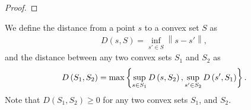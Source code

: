 \begin{proof}
% 
% 

% 
% 

\end{proof}


We define the distance from a point $s$ to a convex set $S$ as
\begin{align*}
D\left(s, S\right) = \inf_{s' \in S} \left\|s - s'\right\|,
\end{align*}
and the distance between any two convex sets $S_1$ and $S_2$ as
\begin{align}
{D}\left(S_1, S_2\right) = 
\max \left\{
	\sup_{s  \in S_1} D\left(s , S_2\right),
	\sup_{s' \in S_2} D\left(s', S_1\right)
\right\}. \label{define_a_difference_between_sets}
\end{align}
Note that $D\left(S_1, S_2\right) \ge 0$ for any two convex sets $S_1$, and $S_2$.


